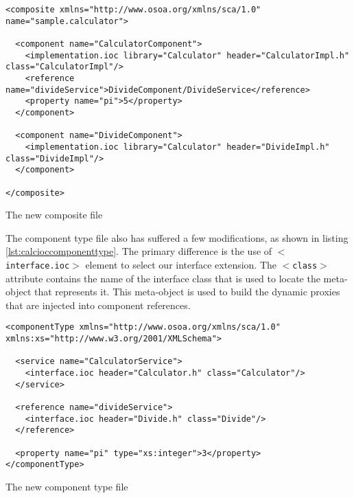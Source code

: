 \begin{listing}
\begin{verbatim}
<composite xmlns="http://www.osoa.org/xmlns/sca/1.0" name="sample.calculator">

  <component name="CalculatorComponent">
    <implementation.ioc library="Calculator" header="CalculatorImpl.h" class="CalculatorImpl"/>
    <reference name="divideService">DivideComponent/DivideService</reference>
    <property name="pi">5</property>
  </component>
        
  <component name="DivideComponent">
    <implementation.ioc library="Calculator" header="DivideImpl.h" class="DivideImpl"/>
  </component>

</composite>
\end{verbatim}
\caption{The new composite file}
\label{lst:calcioccomposite}
\end{listing}

The component type file also has suffered a few modifications, as shown in listing \ref{lst:calcioccomponenttype}.
The primary difference is the use of \texttt{$<$interface.ioc$>$} element to select our interface extension.
The \texttt{$<$class$>$} attribute contains the name of the interface class that is used to locate the
meta-object that represents it. This meta-object is used to build the dynamic proxies that are injected into
component references.

\begin{listing}
\begin{verbatim}
<componentType xmlns="http://www.osoa.org/xmlns/sca/1.0" xmlns:xs="http://www.w3.org/2001/XMLSchema">

  <service name="CalculatorService">
    <interface.ioc header="Calculator.h" class="Calculator"/>
  </service>

  <reference name="divideService">
    <interface.ioc header="Divide.h" class="Divide"/>
  </reference>
  
  <property name="pi" type="xs:integer">3</property>
</componentType>
\end{verbatim}
\caption{The new component type file}
\label{lst:calcioccomponenttype}
\end{listing}


